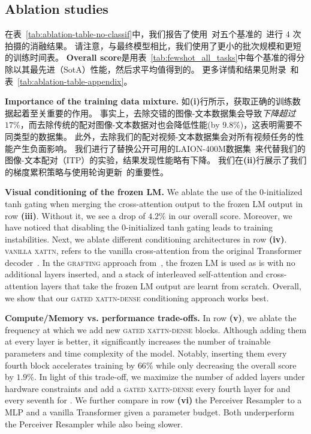 

\subsection{Ablation studies}
\label{sec:ablations}



在表~\ref{tab:ablation-table-no-classif}中，我们报告了使用\base{}~对五个\dev{}基准的\metadevsubsets~进行 4 次拍摄的消融结果。
请注意，与最终模型相比，我们使用了更小的批次规模和更短的训练时间表。
\textbf{Overall score}是用表~\ref{tab:fewshot_all_tasks}中每个基准的得分除以其最先进（SotA）性能，然后求平均值得到的。
更多详情和结果见附录~和表~\ref{tab:ablation-table-appendix}。

\noindent
\textbf{Importance of the training data mixture.}
如\textbf{(i)}行所示，获取正确的训练数据起着至关重要的作用。
事实上，去除交错的图像-文本数据集\mmmw{}会导致\emph{下降超过$17\%$}，而去除传统的配对图像-文本数据对也会降低性能(by $9.8\%$)，这表明需要不同类型的数据集。
此外，去除我们的配对视频-文本数据集会对所有视频任务的性能产生负面影响。 
我们进行了替换公开可用的LAION-400M数据集~\cite{schuhmann2021laion}来代替我们的图像-文本配对（ITP）的实验，结果发现性能略有下降。
我们在\textbf{(ii)}行展示了我们的梯度累积策略与使用轮询更新~\citep{cho2021unifying}的重要性。

\noindent   
\textbf{Visual conditioning of the frozen LM.}
We ablate the use of the 0-initialized tanh gating when merging the cross-attention output to the frozen LM output in row \textbf{(iii)}.
Without it, we see a drop of $4.2\%$ in our overall score.
Moreover, we have noticed that disabling the 0-initialized tanh gating leads to training instabilities.
Next, we ablate different conditioning architectures in row \textbf{(iv)}.
\textsc{vanilla xattn}, refers to the vanilla cross-attention from the original Transformer decoder~\citep{vaswani2017attention}.
In the \textsc{grafting} approach from~\cite{luo2022vc}, the frozen LM is used as is with no additional layers inserted, and a stack of interleaved self-attention and cross-attention layers that take the frozen LM output are learnt from scratch.
Overall, we show that our \textsc{gated xattn-dense} conditioning approach works best.

\noindent
\textbf{Compute/Memory vs. performance trade-offs.}
In row \textbf{(v)}, we ablate the frequency at which we add new \textsc{gated xattn-dense} blocks.
Although adding them at every layer is better, it significantly increases the number of trainable parameters and time complexity of the model.
Notably, inserting them every fourth block accelerates training by $66\%$ while only decreasing the overall score by $1.9\%$.
In light of this trade-off, we maximize the number of added layers under hardware constraints and add a \textsc{gated xattn-dense} every fourth layer for \medium{} and every seventh for \largemfull{}.
We further compare in row \textbf{(vi)} the Perceiver Resampler to a MLP and a vanilla Transformer given a parameter budget.
Both underperform the Perceiver Resampler while also being slower.


